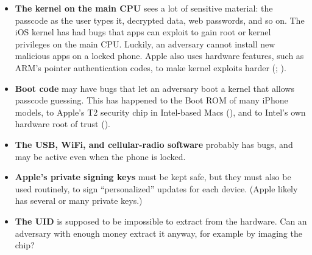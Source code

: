 \documentclass[
  letterpaper,
]{scrbook}
\theoremstyle{definition}
\theoremstyle{plain}
\theoremstyle{plain}
\theoremstyle{remark}
\begin{document}
\begin{itemize}
\item
  \textbf{The kernel on the main CPU} sees a lot of sensitive material:
  the passcode as the user types it, decrypted data, web passwords, and
  so on. The iOS kernel has had bugs that apps can exploit to gain root
  or kernel privileges on the main CPU. Luckily, an adversary cannot
  install new malicious apps on a locked phone. Apple also uses hardware
  features, such as ARM's pointer authentication codes, to make kernel
  exploits harder (;
  ).

\item
  \textbf{Boot code} may have bugs that let an adversary boot a kernel
  that allows passcode guessing. This has happened to the Boot ROM of
  many iPhone models, to Apple's T2 security chip in Intel-based Macs
  (), and to Intel's own hardware
  root of trust ().

\item
  \textbf{The USB, WiFi, and cellular-radio software} probably has bugs,
  and may be active even when the phone is locked.
\item
  \textbf{Apple's private signing keys} must be kept safe, but they must
  also be used routinely, to sign ``personalized'' updates for each
  device. (Apple likely has several or many private keys.)
\item
  \textbf{The UID} is supposed to be impossible to extract from the
  hardware. Can an adversary with enough money extract it anyway, for
  example by imaging the chip?
\end{itemize}
\end{document}

